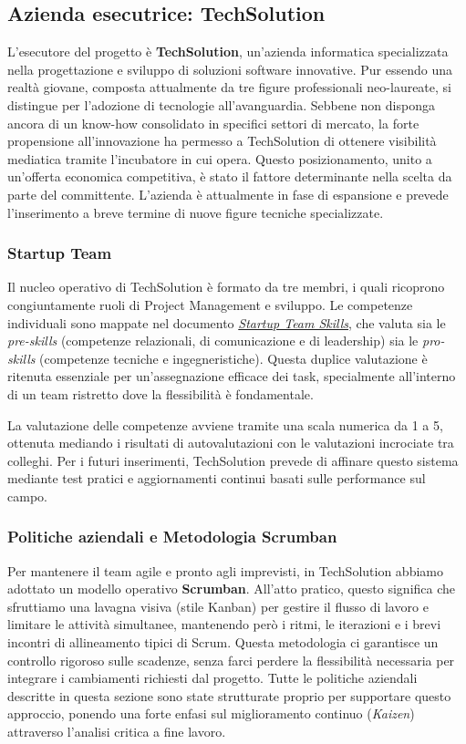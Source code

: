 \documentclass[12pt, a4paper]{article}
\begin{document}
\subsection{Azienda esecutrice: TechSolution}
L'esecutore del progetto è \textbf{TechSolution}, un'azienda informatica specializzata nella progettazione e sviluppo di soluzioni software innovative. Pur essendo una realtà giovane, composta attualmente da tre figure professionali neo-laureate, si distingue per l'adozione di tecnologie all'avanguardia. Sebbene non disponga ancora di un know-how consolidato in specifici settori di mercato, la forte propensione all'innovazione ha permesso a TechSolution di ottenere visibilità mediatica tramite l'incubatore in cui opera. Questo posizionamento, unito a un'offerta economica competitiva, è stato il fattore determinante nella scelta da parte del committente. L'azienda è attualmente in fase di espansione e prevede l'inserimento a breve termine di nuove figure tecniche specializzate.

\subsubsection{Startup Team}
Il nucleo operativo di TechSolution è formato da tre membri, i quali ricoprono congiuntamente ruoli di Project Management e sviluppo. Le competenze individuali sono mappate nel documento \href{https://raw.githubusercontent.com/schwein69/Project-Management/master/docs/TeamSkills/team_skills.pdf}{\textit{Startup Team Skills}}, che valuta sia le \textit{pre-skills} (competenze relazionali, di comunicazione e di leadership) sia le \textit{pro-skills} (competenze tecniche e ingegneristiche). Questa duplice valutazione è ritenuta essenziale per un'assegnazione efficace dei task, specialmente all'interno di un team ristretto dove la flessibilità è fondamentale.

La valutazione delle competenze avviene tramite una scala numerica da 1 a 5, ottenuta mediando i risultati di autovalutazioni con le valutazioni incrociate tra colleghi. Per i futuri inserimenti, TechSolution prevede di affinare questo sistema mediante test pratici e aggiornamenti continui basati sulle performance sul campo.

\subsubsection{Politiche aziendali e Metodologia Scrumban}
Per mantenere il team agile e pronto agli imprevisti, in TechSolution abbiamo adottato un modello operativo \textbf{Scrumban}. All'atto pratico, questo significa che sfruttiamo una lavagna visiva (stile Kanban) per gestire il flusso di lavoro e limitare le attività simultanee, mantenendo però i ritmi, le iterazioni e i brevi incontri di allineamento tipici di Scrum. Questa metodologia ci garantisce un controllo rigoroso sulle scadenze, senza farci perdere la flessibilità necessaria per integrare i cambiamenti richiesti dal progetto. Tutte le politiche aziendali descritte in questa sezione sono state strutturate proprio per supportare questo approccio, ponendo una forte enfasi sul miglioramento continuo (\textit{Kaizen}) attraverso l'analisi critica a fine lavoro.
\end{document}
